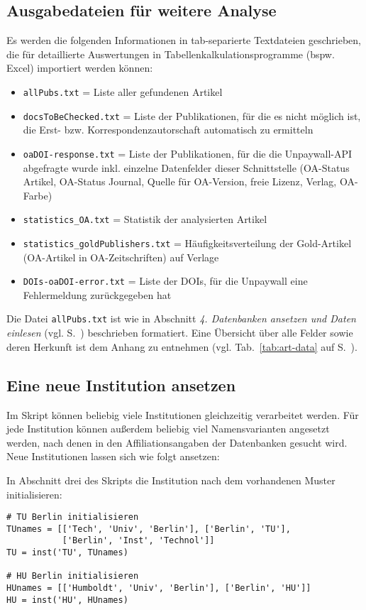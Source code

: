\subsection{Ausgabedateien für weitere Analyse} \label{outputfiles}
Es werden die folgenden Informationen in tab-separierte Textdateien geschrieben, die für detaillierte Auswertungen in Tabellenkalkulationsprogramme (bspw. Excel) importiert werden können:
\begin{itemize}
\item \texttt{allPubs.txt} = Liste aller gefundenen Artikel
\item \texttt{docsToBeChecked.txt} = Liste der Publikationen, für die es nicht möglich ist, die Erst- bzw. Korrespondenzautorschaft automatisch zu ermitteln
\item \texttt{oaDOI-response.txt} = Liste der Publikationen, für die die Unpaywall-API abgefragte wurde inkl. einzelne Datenfelder dieser Schnittstelle (OA-Status Artikel, OA-Status Journal, Quelle für OA-Version, freie Lizenz, Verlag, OA-Farbe)  
\item \texttt{statistics\_OA.txt} = Statistik der analysierten Artikel
\item \texttt{statistics\_goldPublishers.txt} = Häufigkeitsverteilung der Gold-Artikel (OA-Artikel in OA-Zeitschriften) auf Verlage
\item \texttt{DOIs-oaDOI-error.txt} = Liste der DOIs, für die Unpaywall eine Fehlermeldung zurückgegeben hat
\end{itemize}
Die Datei \texttt{allPubs.txt} ist wie in Abschnitt \textit{4. Datenbanken ansetzen und Daten einlesen} (vgl. S.~\pageref{readinput}) beschrieben formatiert. Eine Übersicht über alle Felder sowie deren Herkunft ist dem Anhang zu entnehmen (vgl. Tab.~\ref{tab:art-data} auf S.~\pageref{tab:art-data}).

\subsection{Eine neue Institution ansetzen} \label{newinst}
Im Skript können beliebig viele Institutionen gleichzeitig verarbeitet werden. Für jede Institution können außerdem beliebig viel Namensvarianten angesetzt werden, nach denen in den Affiliationsangaben der Datenbanken gesucht wird. Neue Institutionen lassen sich wie folgt ansetzen:

In Abschnitt drei des Skripts die Institution nach dem vorhandenen Muster initialisieren:
\begin{verbatim}
# TU Berlin initialisieren
TUnames = [['Tech', 'Univ', 'Berlin'], ['Berlin', 'TU'],
           ['Berlin', 'Inst', 'Technol']]
TU = inst('TU', TUnames)

# HU Berlin initialisieren
HUnames = [['Humboldt', 'Univ', 'Berlin'], ['Berlin', 'HU']]
HU = inst('HU', HUnames)
\end{verbatim}

